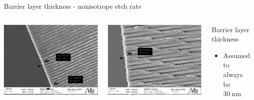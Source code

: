\documentclass[../defence.tex]{subfiles}
\begin{document}
  \begin{frame}{Barrier layer thickness - nonisotrope etch rate}
    \begin{columns}[onlytextwidth, T]
        \includegraphics[width=\linewidth]{images/296c_barrier_layer.jpg}
        \pause

        \includegraphics[width=\linewidth]{images/296e_barrier_layer_meb.jpg}
        \pause

      \begin{alertbox}{Barrier layer thickness}
        \begin{tiny}
          \begin{itemize}
            \item Assumed to always be $\SI{30}{\nano\meter}$
            \pause


\end{itemize}
\end{tiny}
\end{alertbox}
\end{columns}
\end{frame}
\end{document}
